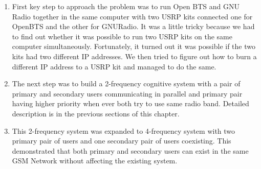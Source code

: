 \begin{enumerate}
\item  First key step to approach the problem was to run Open BTS and GNU 
Radio together in the same computer with two USRP kits connected one for 
OpenBTS and the other for GNURadio. It was a little tricky because we had to
find out whether it was possible to run two USRP kits on the same computer simultaneously.
Fortunately, it turned out it was possible if the two kits had two different IP addresses.
We then tried to figure out how to burn a different IP address to a USRP kit and
managed to do the same.
\item The next step was to build a 2-frequency cognitive system with a pair of 
primary and secondary users communicating in parallel and primary pair having 
higher priority when ever both try to use same radio band. Detailed description 
is in the previous sections of this chapter.
\item This 2-frequency system was expanded to 4-frequency system with two 
primary pair of users and one secondary pair of users coexisting. This 
demonstrated that both primary and secondary users can exist in the same GSM 
Network without affecting the existing system.
\end{enumerate}